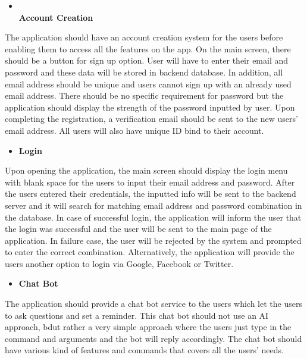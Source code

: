 \documentclass[conference]{IEEEtran}
\begin{document}
\begin{itemize}
\item \textbf{\\Account Creation}
\end{itemize}
\par The application should have an account creation system for the users before enabling them to access all the features on the app. On the main screen, there should be a button for sign up option. User will have to enter their email and password and these data will be stored in backend database. In addition, all email address should be unique and users cannot sign up with an already used email address. There should be no specific requirement for password but the application should display the strength of the password inputted by user. Upon completing the registration, a verification email should be sent to the new users’ email address. All users will also have unique ID bind to their account.\\
\begin{itemize}
\item \textbf{Login}
\end{itemize}
\par Upon opening the application, the main screen should display the login menu with blank space for the users to input their email address and password. After the users entered their credentials, the inputted info will be sent to the backend server and it will search for matching email address and password combination in the database. In case of successful login, the application will inform the user that the login was successful and the user will be sent to the main page of the application. In failure case, the user will be rejected by the system and prompted to enter the correct combination.  Alternatively, the application will provide the users another option to login via Google, Facebook or Twitter.\\
\begin{itemize}
\item \textbf{Chat Bot}
\end{itemize}
\par The application should provide a chat bot service to the users which let the users to ask questions and set a reminder. This chat bot should not use an AI approach, bdut rather a very simple approach where the users just type in the command and arguments and the bot will reply accordingly. The chat bot should have various kind of features and commands that covers all the users’ needs.\\
\end{document}
